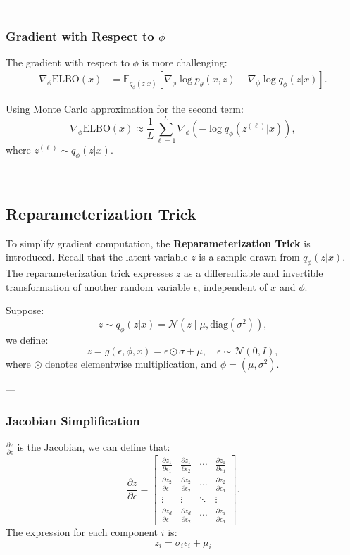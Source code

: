 ---

\subsubsection*{Gradient with Respect to \(\phi\)}
The gradient with respect to \(\phi\) is more challenging:
\begin{align}
\nabla_\phi \text{ELBO}(x) &= \mathbb{E}_{q_\phi(z|x)} 
\left[
\nabla_\phi \log p_\theta(x, z) - \nabla_\phi \log q_\phi(z|x)
\right].
\end{align}

Using Monte Carlo approximation for the second term:
\begin{equation}
\nabla_\phi \text{ELBO}(x) \approx \frac{1}{L} \sum_{\ell=1}^L 
\nabla_\phi 
\left(
- \log q_\phi(z^{(\ell)}|x)
\right),
\end{equation}
where \(z^{(\ell)} \sim q_\phi(z|x)\).

---

\subsection{Reparameterization Trick}
To simplify gradient computation, the \textbf{Reparameterization Trick} is introduced. Recall that the latent variable \(z\) is a sample drawn from \(q_\phi(z|x)\). The reparameterization trick expresses \(z\) as a differentiable and invertible transformation of another random variable \(\epsilon\), independent of \(x\) and \(\phi\).

Suppose:
\begin{equation}
z \sim q_\phi(z|x) = \mathcal{N}(z \mid \mu, \text{diag}(\sigma^2)),
\end{equation}
we define:
\begin{equation}
z = g(\epsilon, \phi, x) = \epsilon \odot \sigma + \mu, \quad \epsilon \sim \mathcal{N}(0, I),
\end{equation}
where \(\odot\) denotes elementwise multiplication, and \(\phi = (\mu, \sigma^2)\).

---

\subsubsection*{Jacobian Simplification}
$\frac{\partial z}{\partial \epsilon}$ is the Jacobian, we can define that:
\[
\frac{\partial z}{\partial \epsilon} =
\begin{bmatrix}
\frac{\partial z_1}{\partial \epsilon_1} & \frac{\partial z_1}{\partial \epsilon_2} & \cdots & \frac{\partial z_1}{\partial \epsilon_d} \\
\frac{\partial z_2}{\partial \epsilon_1} & \frac{\partial z_2}{\partial \epsilon_2} & \cdots & \frac{\partial z_2}{\partial \epsilon_d} \\
\vdots & \vdots & \ddots & \vdots \\
\frac{\partial z_d}{\partial \epsilon_1} & \frac{\partial z_d}{\partial \epsilon_2} & \cdots & \frac{\partial z_d}{\partial \epsilon_d}
\end{bmatrix}.
\]
The expression for each component $i$ is:
\[
z_i = \sigma_i \epsilon_i + \mu_i
\]


